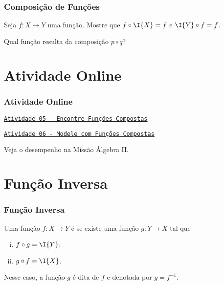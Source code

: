 \documentclass[brazil, notheorems, 10pt]{beamer}
\begin{document}
\begin{frame}
\frametitle{Composição de Funções} %

\begin{exemplo}
Seja $f: X \to Y$ uma função. Mostre que $f \circ \I{X} = f$ e $\I{Y}
\circ f = f$.
\end{exemplo}\pause

\begin{exemplo}
Qual função resulta da composição $p \circ q$?
\end{exemplo}
\end{frame}

\section{Atividade Online}
\begin{frame}
\frametitle{Atividade Online} %

\href{https://pt.khanacademy.org/math/algebra2/manipulating-functions/function-composition/e/compose-functions}
{{\tt Atividade 05 - Encontre Funções Compostas}}

\href{https://pt.khanacademy.org/math/algebra2/manipulating-functions/combining-and-composing-modeling-functions/e/modeling-with-composite-functions}
{{\tt Atividade 06 - Modele com Funções Compostas}}


Veja o desempenho na Missão Álgebra II.


\end{frame}



\section{Função Inversa}
\begin{frame}
\frametitle{Função Inversa} %

\begin{definicao}\label{funinv}
Uma função $f: X \to Y$ é  se existe uma função $g:
Y \to X$ tal que
\begin{enumerate}[(i)]
	\item $f \circ g = \I{Y}$;
	\item $g \circ f = \I{X}$.
\end{enumerate}
Nesse caso, a função $g$ é dita  de $f$ e
denotada por $g = f^{-1}$.
\end{definicao}

\end{frame}
\end{document}
